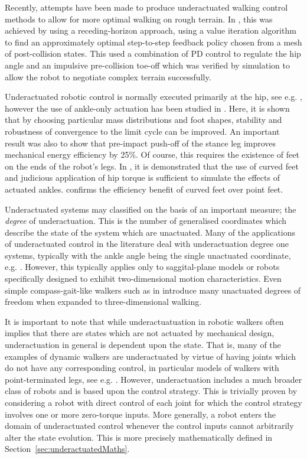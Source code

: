 Recently, attempts have been made to produce underactuated walking control methods to allow for more optimal walking on rough terrain. In \cite{byl2008approximate}, this was achieved by using a receding-horizon approach, using a value iteration algorithm \cite{sutton1998introduction} to find an approximately optimal step-to-step feedback policy chosen from a mesh of post-collision states. This used a combination of PD control to regulate the hip angle and an impulsive pre-collision toe-off which was verified by simulation to allow the robot to negotiate complex terrain successfully.

Underactuated robotic control is normally executed primarily at the hip, see e.g. \cite{tedrake2004actuating, byl2008approximate, manchester2011stable}, however the use of ankle-only actuation has been studied in \cite{franken2008analysis}. Here, it is shown that by choosing particular mass distributions and foot shapes, stability and robustness of convergence to the limit cycle can be improved. An important result was also to show that pre-impact push-off of the stance leg improves mechanical energy efficiency by 25\%. Of course, this requires the existence of feet on the ends of the robot's legs. In \cite{asano2007dynamic}, it is demonstrated that the use of curved feet and judicious application of hip torque is sufficient to simulate the effects of actuated ankles. \cite{martin2014design} confirms the efficiency benefit of curved feet over point feet.

Underactuated systems may classified on the basis of an important measure; the \textit{degree} of underactuation. This is the number of generalised coordinates which describe the state of the system which are unactuated. Many of the applications of underactuated control in the literature deal with underactuation degree one systems, typically with the ankle angle being the single unactuated coordinate, e.g. \cite{byl2008approximate, westervelt2003hybrid}. However, this typically applies only to saggital-plane models or robots specifically designed to exhibit two-dimensional motion characteristics. Even simple compass-gait-like walkers such as in \cite{tedrake2004actuating} introduce many unactuated degrees of freedom when expanded to three-dimensional walking.

It is important to note that while underactuatuation in robotic walkers often implies that there are states which are not actuated by mechanical design, underactuation in general is dependent upon the state. That is, many of the examples of dynamic walkers are underactuated by virtue of having joints which do not have any corresponding control, in particular models of walkers with point-terminated legs, see e.g. \cite{westervelt2003hybrid}. However, underactuation includes a much broader class of robots and is based upon the control strategy. This is trivially proven by considering a robot with direct control of each joint for which the control strategy involves one or more zero-torque inputs. More generally, a robot enters the domain of underactuated control whenever the control inputs cannot arbitrarily alter the state evolution. This is more precisely mathematically defined in Section~\ref{sec:underactuatedMaths}.


